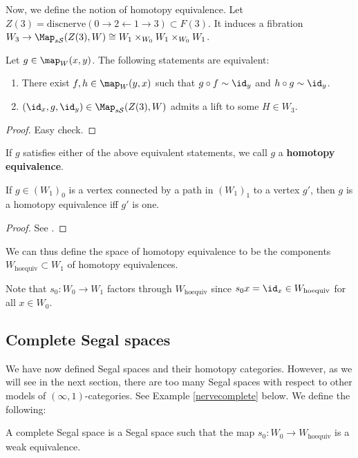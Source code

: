 Now, we define the notion of homotopy equivalence. Let $Z(3)=\mathrm{discnerve}(0\to2\leftarrow1\to3)\subset F(3)$. It induces a fibration $W_3\to\Map_{s\mathcal S}(Z(3),W)\cong W_1\times_{W_0}W_1\times_{W_0}W_1$.

\begin{prop}
Let $g\in\map_W(x,y)$. The following statements are equivalent:
\begin{enumerate}
\item There exist $f,h\in\map_W(y,x)$ such that $g\circ f\sim\id_y$ and $h\circ g\sim\id_y$.
\item $(\id_x,g,\id_y)\in\Map_{s\mathcal S}(Z(3),W)$ admits a lift to some $H\in W_3$.
\end{enumerate}
\end{prop}
\begin{proof}
Easy check.
\end{proof}

If $g$ satisfies either of the above equivalent statements, we call $g$ a {\bf homotopy equivalence}.

\begin{lemma}
If $g\in (W_1)_0$ is a vertex connected by a path in $(W_1)_1$ to a vertex $g'$, then $g$ is a homotopy equivalence iff $g'$ is one.
\end{lemma}
\begin{proof}
See \cite[Lemma 5.8]{rezk}.
\end{proof}

\begin{defin}
We can thus define the space of homotopy equivalence to be the components $W_{\mathrm{hoequiv}}\subset W_1$ of homotopy equivalences.
\end{defin}
Note that $s_0:W_0\to W_1$ factors through $W_{\mathrm{hoequiv}}$ since $s_0x=\id_x\in W_{\mathrm{hoequiv}}$ for all $x\in W_0$.

\subsection{Complete Segal spaces}
We have now defined Segal spaces and their homotopy categories. However, as we will see in the next section, there are too many Segal spaces with respect to other models of $(\infty,1)$-categories. See Example \ref{nervecomplete} below.
We define the following:
\begin{defin}
A complete Segal space is a Segal space such that the map $s_0:W_0\to W_{\mathrm{hoequiv}}$ is a weak equivalence.
\end{defin}

